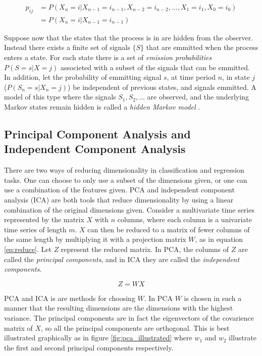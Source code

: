\begin{equation}
    \begin{split}
        p_{ij}  &= P(X_n = i | X_{n-1} = i_{n-1}, X_{n-2} = i_{n-2},..., X_{1} = i_{1}, X_{0} = i_{0}) \\
                &= P(X_n = i | X_{n-1} = i_{n-1})      
    \end{split}
    \label{eq:markov_property}
\end{equation}

Suppose now that the states that the process is in are hidden from the observer. 
Instead there exists a finite set of signals $\{S\}$ that are emmitted when the process enters a state. 
For each state there is a set of \textit{emission probabilities} $P(S = s | X = j)$ associeted with a subset of the signals that can be emmitted.
In addition, let the probability of emmitting signal $s$, at time period $n$, in state $j$ ($P(S_n = s | X_n = j)$) be independent of previous states, and signals emmitted. 
A model of this type where the signals $S_1, S_2, ...$ are observed, and the underlying Markov states remain hidden is called a \textit{hidden Markov model} \cite{stoch_pros}. 

\subsection{Principal Component Analysis and Independent Component Analysis}
There are two ways of reducing dimensionality in classification and regression tasks. 
One can choose to only use a subset of the dimensions given, or one can use a combination of the features given.
PCA and independent component analysis (ICA) are both tools that reduce dimensionality by using a linear combination of the original dimensions given.
Consider a multivariate time series represented by the matrix $X$ with $n$ columns, where each column is a univariate time series of length $m$.
$X$ can then be reduced to a matrix of fewer columns of the same length by multiplying it with a projection matrix $W$, as in equation \ref{eq:reduce}. 
Let $Z$ represent the reduced matrix.
In PCA, the columns of $Z$ are called the \textit{principal components}, and in ICA they are called the \textit{independent components}. 

\begin{equation}
    Z = W X
    \label{eq:reduce}
\end{equation}

PCA and ICA is are methods for choosing $W$. 
In PCA $W$ is chosen in such a manner that the resulting dimensions are the dimensions with the highest variance.
The principal components are in fact the eigenvectors of the covarience matrix of $X$, so all the principal components are orthogonal. 
This is best illustrated graphically as in figure \ref{fig:pca_illustrated} where $w_1$ and $w_2$ illustrate the first and second principal components respectively.

